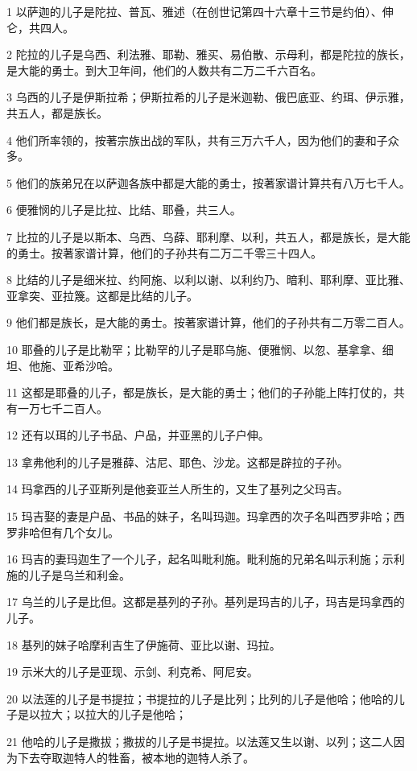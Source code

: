 \par 1 以萨迦的儿子是陀拉、普瓦、雅述（在创世记第四十六章十三节是约伯）、伸仑，共四人。
\par 2 陀拉的儿子是乌西、利法雅、耶勒、雅买、易伯散、示母利，都是陀拉的族长，是大能的勇士。到大卫年间，他们的人数共有二万二千六百名。
\par 3 乌西的儿子是伊斯拉希；伊斯拉希的儿子是米迦勒、俄巴底亚、约珥、伊示雅，共五人，都是族长。
\par 4 他们所率领的，按著宗族出战的军队，共有三万六千人，因为他们的妻和子众多。
\par 5 他们的族弟兄在以萨迦各族中都是大能的勇士，按著家谱计算共有八万七千人。
\par 6 便雅悯的儿子是比拉、比结、耶叠，共三人。
\par 7 比拉的儿子是以斯本、乌西、乌薛、耶利摩、以利，共五人，都是族长，是大能的勇士。按著家谱计算，他们的子孙共有二万二千零三十四人。
\par 8 比结的儿子是细米拉、约阿施、以利以谢、以利约乃、暗利、耶利摩、亚比雅、亚拿突、亚拉篾。这都是比结的儿子。
\par 9 他们都是族长，是大能的勇士。按著家谱计算，他们的子孙共有二万零二百人。
\par 10 耶叠的儿子是比勒罕；比勒罕的儿子是耶乌施、便雅悯、以忽、基拿拿、细坦、他施、亚希沙哈。
\par 11 这都是耶叠的儿子，都是族长，是大能的勇士；他们的子孙能上阵打仗的，共有一万七千二百人。
\par 12 还有以珥的儿子书品、户品，并亚黑的儿子户伸。
\par 13 拿弗他利的儿子是雅薛、沽尼、耶色、沙龙。这都是辟拉的子孙。
\par 14 玛拿西的儿子亚斯列是他妾亚兰人所生的，又生了基列之父玛吉。
\par 15 玛吉娶的妻是户品、书品的妹子，名叫玛迦。玛拿西的次子名叫西罗非哈；西罗非哈但有几个女儿。
\par 16 玛吉的妻玛迦生了一个儿子，起名叫毗利施。毗利施的兄弟名叫示利施；示利施的儿子是乌兰和利金。
\par 17 乌兰的儿子是比但。这都是基列的子孙。基列是玛吉的儿子，玛吉是玛拿西的儿子。
\par 18 基列的妹子哈摩利吉生了伊施荷、亚比以谢、玛拉。
\par 19 示米大的儿子是亚现、示剑、利克希、阿尼安。
\par 20 以法莲的儿子是书提拉；书提拉的儿子是比列；比列的儿子是他哈；他哈的儿子是以拉大；以拉大的儿子是他哈；
\par 21 他哈的儿子是撒拔；撒拔的儿子是书提拉。以法莲又生以谢、以列；这二人因为下去夺取迦特人的牲畜，被本地的迦特人杀了。

